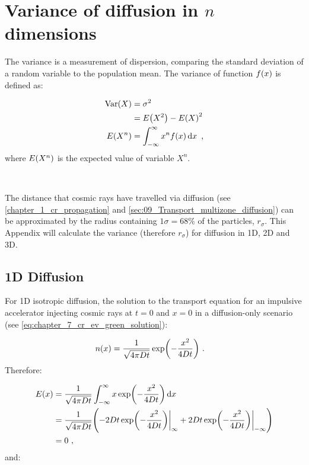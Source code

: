 \chapter{Variance of diffusion in $n$ dimensions} \label{sec:A5_variance}

The variance is a measurement of dispersion, comparing the standard deviation of a random variable to the population mean. The variance of function $f\qty(x)$ is defined as:

\begin{equation}
    \begin{aligned}
        \mathrm{Var}\qty(X)&=\sigma^2 \\
        &=E\qty(X^2)-E\qty(X)^2 \\
        E\qty(X^n)&=\int_{-\infty}^\infty x^nf\qty(x)\dd{x}\text{ ,} 
    \end{aligned}
\end{equation}
\noindent where $E\qty(X^n)$ is the expected value of variable $X^n$.
\par~\par 
The distance that cosmic rays have travelled via diffusion (see \autoref{chapter_1_cr_propagation} and \autoref{sec:09_Transport_multizone_diffusion}) can be approximated by the radius containing $1\sigma=68\%$ of the particles, $r_\sigma$. This Appendix will calculate the variance (therefore $r_\sigma$) for diffusion in 1D, 2D and 3D. 

\section{1D Diffusion}

\noindent For 1D isotropic diffusion, the solution to the transport equation for an impulsive accelerator injecting cosmic rays at $t=0$ and $x=0$ in a diffusion-only scenario (see \autoref{eq:chapter_7_cr_ev_green_solution}):

\begin{equation}
    \begin{aligned}
        n\qty(x)&=\frac{1}{\sqrt{4\pi Dt}}\exp(-\frac{x^2}{4Dt})\text{ .} 
    \end{aligned}
\end{equation}
\noindent Therefore:

\begin{equation}
    \begin{aligned}
        E\qty(x)&=\frac{1}{\sqrt{4\pi Dt}}\int_{-\infty}^\infty x\exp(-\frac{x^2}{4Dt})\dd{x} \\
        &=\frac{1}{\sqrt{4\pi Dt}}\qty(-2Dt\exp(-\frac{x^2}{4Dt})\bigg|_\infty+2Dt\exp(-\frac{x^2}{4Dt})\bigg|_{-\infty}) \\
        &=0\text{ ,} 
    \end{aligned}
\end{equation}
\noindent and:

